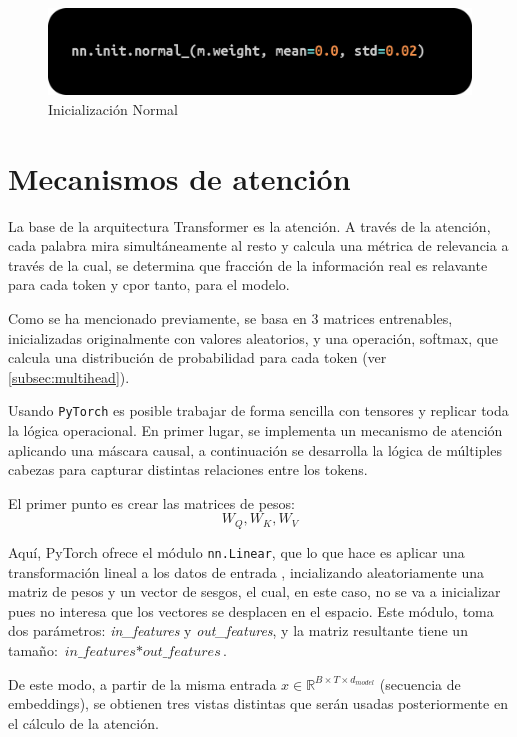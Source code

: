 \documentclass[11pt]{book}
\begin{document}
\begin{figure}[h]
    \centering
    \includegraphics[width=0.5\linewidth]{img/normal_init.png}
    \caption{Inicialización Normal}
    \label{fig:placeholder18}
\end{figure}


\section{Mecanismos de atención}
La base de la arquitectura Transformer es la atención. A través de la atención, cada palabra mira simultáneamente al resto y calcula una métrica de relevancia a través de la cual, se determina que fracción de la información real es relavante para cada token y cpor tanto, para el modelo. 

Como se ha mencionado previamente, se basa en 3 matrices entrenables, inicializadas originalmente con valores aleatorios, y una operación, softmax, que calcula una distribución de probabilidad para cada token (ver \cref{subsec:multihead}).

Usando \texttt{PyTorch} es posible trabajar de forma sencilla con tensores y replicar toda la lógica operacional. En primer lugar, se implementa un mecanismo de atención aplicando una máscara causal, a continuación se desarrolla la lógica de múltiples cabezas para capturar distintas relaciones entre los tokens.

El primer punto es crear las matrices de pesos: 
\[W_Q, W_K, W_V\]

Aquí, PyTorch ofrece el módulo \texttt{nn.Linear}, que lo que hace es aplicar una transformación lineal a los datos de entrada \parencite{kanaries_nnlinear}, incializando aleatoriamente una matriz de pesos y un vector de sesgos, el cual, en este caso, no se va a inicializar pues no interesa que los vectores se desplacen en el espacio. Este módulo, toma dos parámetros: \textit{in\_features} y \textit{out\_features}, y la matriz resultante tiene un tamaño: $\textit{in\_features} * \textit{out\_features}$.

De este modo, a partir de la misma entrada $x \in \mathbb{R}^{B \times T \times d_{model}}$ (secuencia de embeddings), se obtienen tres vistas distintas que serán usadas posteriormente en el cálculo de la atención.
\end{document}
